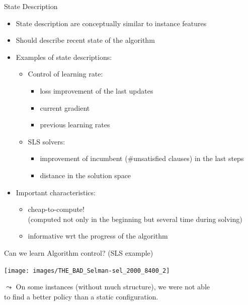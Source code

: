 \begin{frame}[c]{State Description}

\begin{itemize}
  \item State description are conceptually similar to instance features
  \item Should describe recent state of the algorithm
  \medskip
  \pause
  \item Examples of state descriptions:
  \begin{itemize}
    \item Control of learning rate:
    \begin{itemize}
      \item loss improvement of the last updates
      \item current gradient
      \item previous learning rates
    \end{itemize}
    \item SLS solvers:
    \begin{itemize}
      \item improvement of incumbent ($\#$unsatisfied clauses) in the last steps
      \item distance in the solution space  
    \end{itemize}
  \end{itemize}
  \medskip
  \pause
  \item Important characteristics:
  \begin{itemize}
    \item cheap-to-compute!\\ (computed not only in the beginning but several time during solving)
    \item informative wrt the progress of the algorithm
  \end{itemize}
\end{itemize}

\end{frame}
\begin{frame}[c]{Can we learn Algorithm control? (SLS example)}

\texttt{[image: images/THE\_BAD\_Selman-sel\_2000\_8400\_2]}

\pause
$\leadsto$ On some instances (without much structure), we were not able\\ to find a better policy than a static configuration.

\end{frame}
